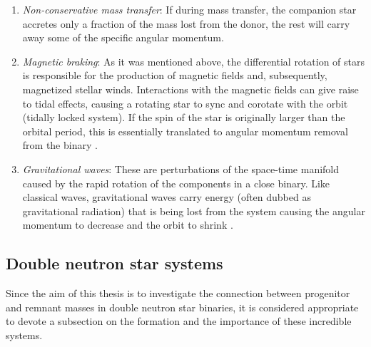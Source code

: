 \documentclass[../../main/thesis_msc.tex]{subfiles}
\begin{document}
				\begin{enumerate}[label=(\roman*)]
				
					\item \emph{Non-conservative mass transfer}: If during mass transfer, the companion star accretes only a fraction of the mass lost from the donor, the rest will carry away some of the specific angular momentum.
					\item \emph{Magnetic braking}: As it was mentioned above, the differential rotation of stars is responsible for the production of magnetic fields and, subsequently, magnetized stellar winds. Interactions with the magnetic fields can give raise to tidal effects, causing a rotating star to sync and corotate with the orbit (tidally locked system). If the spin of the star is originally larger than the orbital period, this is essentially translated to angular momentum removal from the binary \citep[see also][]{Rappaport1983}.
					\item \emph{Gravitational waves}:  These are perturbations of the space-time manifold caused by the rapid rotation of the components in a close binary. Like classical waves, gravitational waves carry energy (often dubbed as gravitational radiation) that is being lost from the system causing the angular momentum to decrease and the orbit to shrink \citep[see also][]{Peters1964, Riles2013}.
				
				\end{enumerate}
				
				
			\subsection{Double neutron star systems}
			
				Since the aim of this thesis is to investigate the connection between progenitor and remnant masses in double neutron star binaries, it is considered appropriate to devote a subsection on the formation and the importance of these incredible systems.
				
\end{document}
